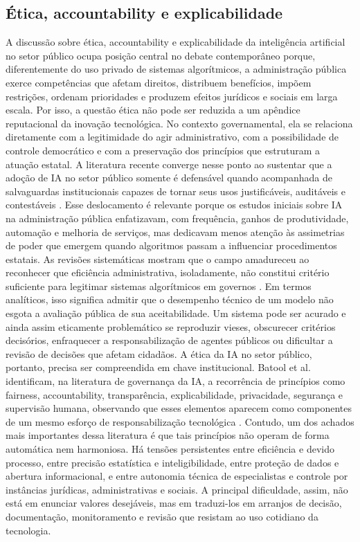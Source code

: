 \documentclass[12pt,a4paper]{article}
\begin{document}
\subsection{Ética, accountability e explicabilidade}
\label{sec:org2fab9ee}
A discussão sobre ética, accountability e explicabilidade da inteligência artificial no setor público ocupa posição central no debate contemporâneo porque, diferentemente do uso privado de sistemas algorítmicos, a administração pública exerce competências que afetam direitos, distribuem benefícios, impõem restrições, ordenam prioridades e produzem efeitos jurídicos e sociais em larga escala. Por isso, a questão ética não pode ser reduzida a um apêndice reputacional da inovação tecnológica. No contexto governamental, ela se relaciona diretamente com a legitimidade do agir administrativo, com a possibilidade de controle democrático e com a preservação dos princípios que estruturam a atuação estatal. A literatura recente converge nesse ponto ao sustentar que a adoção de IA no setor público somente é defensável quando acompanhada de salvaguardas institucionais capazes de tornar seus usos justificáveis, auditáveis e contestáveis \autocite{sigfrids2022how} \autocite{serra2024a} \autocite{batool2025ai}.
Esse deslocamento é relevante porque os estudos iniciais sobre IA na administração pública enfatizavam, com frequência, ganhos de produtividade, automação e melhoria de serviços, mas dedicavam menos atenção às assimetrias de poder que emergem quando algoritmos passam a influenciar procedimentos estatais. As revisões sistemáticas mostram que o campo amadureceu ao reconhecer que eficiência administrativa, isoladamente, não constitui critério suficiente para legitimar sistemas algorítmicos em governos \autocite{madan2022ai} \autocite{alhosani2024opportunities}. Em termos analíticos, isso significa admitir que o desempenho técnico de um modelo não esgota a avaliação pública de sua aceitabilidade. Um sistema pode ser acurado e ainda assim eticamente problemático se reproduzir vieses, obscurecer critérios decisórios, enfraquecer a responsabilização de agentes públicos ou dificultar a revisão de decisões que afetam cidadãos.
A ética da IA no setor público, portanto, precisa ser compreendida em chave institucional. Batool et al. identificam, na literatura de governança da IA, a recorrência de princípios como fairness, accountability, transparência, explicabilidade, privacidade, segurança e supervisão humana, observando que esses elementos aparecem como componentes de um mesmo esforço de responsabilização tecnológica \autocite{batool2025ai}. Contudo, um dos achados mais importantes dessa literatura é que tais princípios não operam de forma automática nem harmoniosa. Há tensões persistentes entre eficiência e devido processo, entre precisão estatística e inteligibilidade, entre proteção de dados e abertura informacional, e entre autonomia técnica de especialistas e controle por instâncias jurídicas, administrativas e sociais. A principal dificuldade, assim, não está em enunciar valores desejáveis, mas em traduzi-los em arranjos de decisão, documentação, monitoramento e revisão que resistam ao uso cotidiano da tecnologia.
\end{document}
